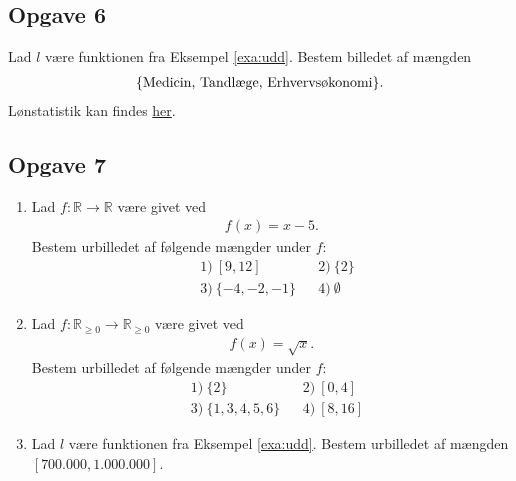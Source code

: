 \subsection*{Opgave 6}
Lad $l$ være funktionen fra Eksempel \ref{exa:udd}. Bestem billedet af mængden 
\begin{align*}
\{\textnormal{Medicin, Tandlæge, Erhvervsøkonomi}\}.
\end{align*}
Lønstatistik kan findes \href{https://cepos.dk/artikler/se-listen-hvilke-uddannelser-giver-den-hoejeste-indkomst/}{\color{blue!60} her}.

\subsection*{Opgave 7}
\begin{enumerate}[label=\roman*)]
\item Lad $f: \mathbb{R} \to \mathbb{R}$ være givet ved 
\begin{align*}
	f(x) = x-5.
\end{align*}
Bestem urbilledet af følgende mængder under $f$:
\begin{align*}
	&1) \  [9,12] &&2) \ \{2\}\\
	&3) \ \{-4,-2,-1\} &&4) \ \emptyset
\end{align*}

\item Lad $f:\mathbb{R}_{\geq 0} \to \mathbb{R}_{\geq 0}$ være givet ved
\begin{align*}
	f(x) = \sqrt{x}.
\end{align*}
Bestem urbilledet af følgende mængder under $f$:
\begin{align*}
	&1) \ \{2\}  &&2) \  [0,4] \\
	&3) \ \{1,3,4,5,6\} &&4) \ [8,16] 
\end{align*}

\item Lad $l$ være funktionen fra Eksempel \ref{exa:udd}. Bestem urbilledet af mængden $[700.000,1.000.000]$.
\end{enumerate}

